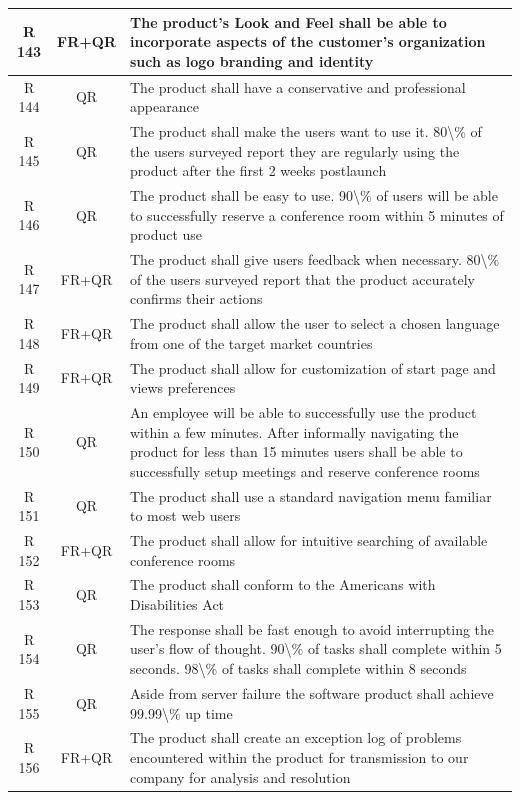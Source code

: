 \documentclass[dissertation,final]{softeng}
\begin{document}
\begin{appendices}
{\begin{center}
\begin{longtable}{c c m{}}
    R 143   & FR+QR & The product's Look and Feel shall be able to incorporate aspects of the customer's organization such as logo branding and identity \\*    \midrule
    R 144   & QR & The product shall have a conservative and professional appearance \\    \midrule
    R 145   & QR & The product shall make the users want to use it. 80\textbackslash{}\% of the users surveyed report they are regularly using the product after the first 2 weeks postlaunch \\    \midrule
    R 146   & QR & The product shall be easy to use. 90\textbackslash{}\% of users will be able to successfully reserve a conference room within 5 minutes of product use \\*    \midrule
    R 147   & FR+QR & The product shall give users feedback when necessary. 80\textbackslash{}\% of the users surveyed report that the product accurately confirms their actions \\    \midrule
    R 148   & FR+QR & The product shall allow the user to select a chosen language from one of the target market countries \\ \midrule
    R 149   & FR+QR & The product shall allow for customization of start page and views preferences \\    \midrule
    R 150   & QR & An employee will be able to successfully use the product within a few minutes. After informally navigating the product for less than 15 minutes users shall be able to successfully setup meetings and reserve conference rooms \\    \midrule
    R 151   & QR & The product shall use a standard navigation menu familiar to most web users \\    \midrule
    R 152   & FR+QR & The product shall allow for intuitive searching of available conference rooms \\    \midrule
    R 153   & QR & The product shall conform to the Americans with Disabilities Act \\    \midrule
    R 154   & QR & The response shall be fast enough to avoid interrupting the user's flow of thought. 90\textbackslash{}\% of tasks shall complete within 5 seconds. 98\textbackslash{}\% of tasks shall complete within 8 seconds \\    \midrule
    R 155   & QR & Aside from server failure the software product shall achieve 99.99\textbackslash{}\% up time \\    \midrule
    R 156   & FR+QR &  The product shall create an exception log of problems encountered within the product for transmission to our company for analysis and resolution \\    \midrule

\end{longtable}
\end{center}}
\end{appendices}
\end{document}
